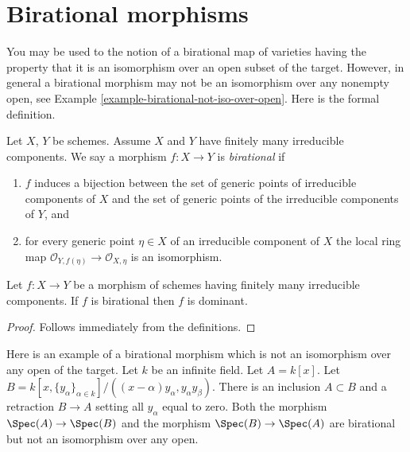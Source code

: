 \section{Birational morphisms}
\label{section-birational}

\noindent
You may be used to the notion of a birational map of varieties
having the property that it is an isomorphism over an open subset
of the target. However, in general a birational morphism may
not be an isomorphism over any nonempty open, see
Example \ref{example-birational-not-iso-over-open}.
Here is the formal definition.

\begin{definition}
\label{definition-birational}
\begin{reference}
\cite[(2.2.9)]{EGA1}
\end{reference}
Let $X$, $Y$ be schemes. Assume $X$ and $Y$ have finitely many
irreducible components. We say a morphism $f : X \to Y$ is
{\it birational} if
\begin{enumerate}
\item $f$ induces a bijection between the set of generic points
of irreducible components of $X$ and the set of generic points
of the irreducible components of $Y$, and
\item for every generic point $\eta \in X$ of an irreducible component
of $X$ the local ring map
$\mathcal{O}_{Y, f(\eta)} \to \mathcal{O}_{X, \eta}$
is an isomorphism.
\end{enumerate}
\end{definition}

\begin{lemma}
\label{lemma-birational-dominant}
Let $f : X \to Y$ be a morphism of schemes having finitely
many irreducible components. If $f$ is birational then
$f$ is dominant.
\end{lemma}

\begin{proof}
Follows immediately from the definitions.
\end{proof}

\begin{example}
\label{example-birational-not-iso-over-open}
Here is an example of a birational morphism which is not an isomorphism
over any open of the target.
Let $k$ be an infinite field.
Let $A = k[x]$. Let
$B = k[x, \{y_{\alpha}\}_{\alpha \in k}]/
((x-\alpha)y_\alpha, y_\alpha y_\beta)$.
There is an inclusion $A \subset B$ and a retraction $B \to A$
setting all $y_\alpha$ equal to zero.
Both the morphism $\Spec(A) \to \Spec(B)$
and the morphism $\Spec(B) \to \Spec(A)$ are birational
but not an isomorphism over any open.
\end{example}





